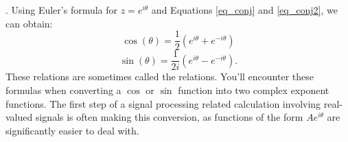 . Using Euler's formula for $z=e^{i\theta}$ and Equations \ref{eq_conj} and \ref{eq_conj2}, we can obtain:
\begin{equation}
\boxed{
  \cos(\theta)  = \frac{1}{2}\left(e^{i\theta} + e^{-i\theta}\right) \label{inveul0}
  }
  \end{equation}
\begin{equation}
\boxed{
  \sin(\theta)  = \frac{1}{2i}\left(e^{i\theta} - e^{-i\theta}\right). \label{inveul}
  }
\end{equation}
These relations are sometimes called the \emph{} relations. You'll encounter these formulas when converting a $\cos$ or $\sin$ function into two complex exponent functions. The first step of a signal processing related calculation involving real-valued signals is often making this conversion, as functions of the form $A e^{i\theta}$ are significantly easier to deal with.


